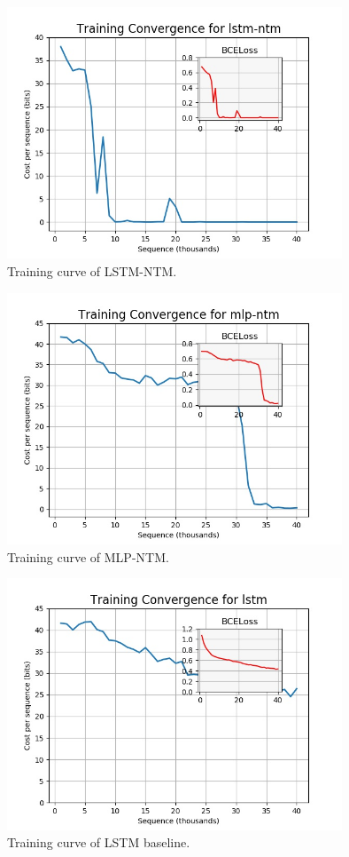 \documentclass{amsart}
\theoremstyle{definition}
\theoremstyle{remark}
\numberwithin{equation}{section}
\begin{document}
\begin{figure}[h]
\includegraphics[width=100mm]{outputs/lstm-ntm_convergence}
\caption{Training curve of LSTM-NTM.}
\label{Figure 1}
\end{figure}

\begin{figure}[h]
\includegraphics[width=100mm]{outputs/mlp-ntm_convergence}
\caption{Training curve of MLP-NTM.}
\label{Figure 2}
\end{figure}

\begin{figure}[h]
\includegraphics[width=100mm]{outputs/lstm_convergence}
\caption{Training curve of LSTM baseline.}
\label{Figure 3}
\end{figure}
\end{document}
